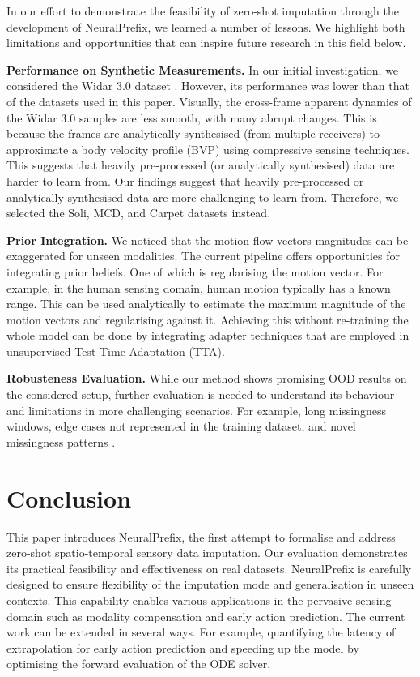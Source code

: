 \documentclass[10pt, conference, compsocconf]{IEEEtran}
\def\update#1{#1}
\begin{document}
In our effort to demonstrate the feasibility of \update{zero-shot} imputation through the development of NeuralPrefix, we learned a number of lessons. We highlight both limitations and opportunities that can inspire future research in this field below. 

\textbf{Performance on Synthetic Measurements.} In our initial investigation, we considered the Widar 3.0 dataset \cite{zheng2019zero}. However, its performance was lower than that of the datasets used in this paper. Visually,  the cross-frame apparent dynamics of the Widar 3.0 samples are less smooth, with many abrupt changes. This is because the frames are analytically synthesised (from multiple receivers) to approximate a body velocity profile (BVP) using compressive sensing techniques. This suggests that heavily pre-processed (or analytically synthesised) data are harder to learn from. Our findings suggest that heavily pre-processed or analytically synthesised data are more challenging to learn from. Therefore, we selected the Soli, MCD, and Carpet datasets instead. 

\textbf{Prior Integration.}  We noticed that the motion flow \update{vectors magnitudes} can be exaggerated for unseen modalities.  The current pipeline offers opportunities for integrating prior beliefs. One of which is regularising the motion vector. For example, in the human sensing domain, \update{human} motion typically has a known range. This can be used analytically to estimate the maximum magnitude \update{of the} motion vectors and regularising against it. Achieving this without re-training the whole model can be done by integrating adapter techniques \cite {kang2024sf} that are employed in unsupervised Test Time Adaptation (TTA). 


\update{\textbf{Robusteness Evaluation.} While our method shows promising OOD results on the considered setup, further evaluation is needed to understand its behaviour and limitations in more challenging scenarios. For example, long missingness windows,  edge cases not represented in the training dataset, and novel missingness patterns \cite{qian2024unveiling}.} 










\section{Conclusion}

This paper introduces NeuralPrefix, the first attempt to formalise and address zero-shot spatio-temporal sensory data imputation. Our evaluation demonstrates its practical feasibility and effectiveness on real datasets. NeuralPrefix is carefully designed to ensure flexibility of the imputation mode and generalisation in unseen contexts.  This capability enables various applications in the pervasive sensing domain such as modality compensation and early action prediction. The current work can be extended in several ways. For example, quantifying the latency of extrapolation for early action prediction and speeding up the model by optimising the forward evaluation of the ODE solver. 




\end{document}
